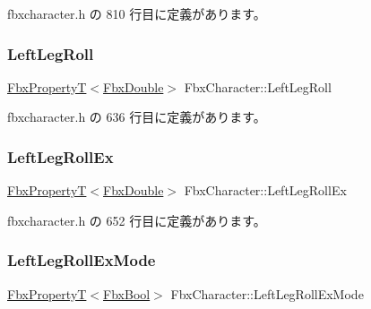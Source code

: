 fbxcharacter.\+h の 810 行目に定義があります。

\mbox{\label{class_fbx_character_a8102d99e903d36ea2e3ae8cf24ec400d}} 
\subsubsection{\texorpdfstring{Left\+Leg\+Roll}{LeftLegRoll}}
{\footnotesize\ttfamily \hyperlink{class_fbx_property_t}{Fbx\+PropertyT}$<$\hyperlink{fbxtypes_8h_a171e72a1c46fc15c1a6c9c31948c1c5b}{Fbx\+Double}$>$ Fbx\+Character\+::\+Left\+Leg\+Roll}



 fbxcharacter.\+h の 636 行目に定義があります。

\mbox{\label{class_fbx_character_a2af8b40afb59381a80e02b2046997e93}} 
\subsubsection{\texorpdfstring{Left\+Leg\+Roll\+Ex}{LeftLegRollEx}}
{\footnotesize\ttfamily \hyperlink{class_fbx_property_t}{Fbx\+PropertyT}$<$\hyperlink{fbxtypes_8h_a171e72a1c46fc15c1a6c9c31948c1c5b}{Fbx\+Double}$>$ Fbx\+Character\+::\+Left\+Leg\+Roll\+Ex}



 fbxcharacter.\+h の 652 行目に定義があります。

\mbox{\label{class_fbx_character_af932f9843a39519efa5d93731e61a601}} 
\subsubsection{\texorpdfstring{Left\+Leg\+Roll\+Ex\+Mode}{LeftLegRollExMode}}
{\footnotesize\ttfamily \hyperlink{class_fbx_property_t}{Fbx\+PropertyT}$<$\hyperlink{fbxtypes_8h_a92e0562b2fe33e76a242f498b362262e}{Fbx\+Bool}$>$ Fbx\+Character\+::\+Left\+Leg\+Roll\+Ex\+Mode}



